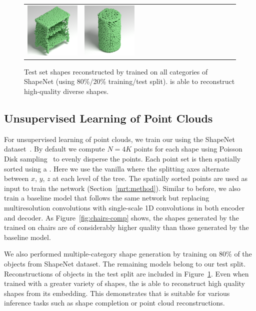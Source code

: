 \begin{figure}[t]
\begin{tabular}{cccccccccccccccc}
\includegraphics[width=.1\linewidth]{MRTNet/rendering/selected/rec_shapenet/pc_0048.png} &
\includegraphics[width=.1\linewidth]{MRTNet/rendering/selected/rec_shapenet/pc_0054.png}
\end{tabular}
\vspace{-12pt}
    \caption{\label{fig:gallery} 
    \small Test set shapes reconstructed by \mrvae trained on all categories of ShapeNet (using 80\%/20\% training/test split). \mrvae is able to reconstruct high-quality diverse shapes.}
    \vspace{-8pt}
\end{figure}

\subsection{Unsupervised Learning of Point Clouds} \label{sec:exp_gen}
For unsupervised learning of point clouds, we train our \mrvae using the ShapeNet dataset~\cite{chang2015shapenet}. 
By default we compute $N=4K$ points for each shape using Poisson Disk sampling~\cite{Bowers:2010:PPD} to evenly disperse the points. 
Each point set is then spatially sorted using a \kdtree. 
Here we use the vanilla \kdtree where the splitting axes alternate between $x$, $y$, $z$ at each level of the tree. 
The spatially sorted points are used as input to train the \mrvae network (Section~\ref{mrt:method}). 
Similar to before, we also train a baseline model that follows the same network but replacing multiresolution convolutions with single-scale 1D convolutions
in both encoder and decoder. 
As Figure~\ref{fig:chairs-comp} shows, the shapes generated by the \mrvae trained on chairs are of considerably higher quality than those generated by the baseline model. 

We also performed multiple-category shape generation by training \mrvae on $80\%$ of the objects from ShapeNet dataset. 
The remaining models belong to our test split. 
Reconstructions of objects in the test split are included in Figure~\ref{fig:gallery}. 
Even when trained with a greater variety of shapes, the \mrvae is able to reconstruct high quality shapes from its embedding. 
This demonstrates that \mrvae is suitable for various inference tasks such as shape completion or point cloud reconstructions.


